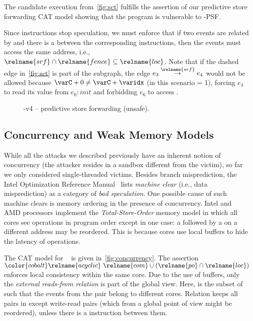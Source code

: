 \documentclass[conference]{IEEEtran}
\begin{document}
The candidate execution from~\autoref{fig:sct} fulfills the assertion of our predictive store forwarding CAT model showing that the program is vulnerable to \spectre-\textsc{PSF}.


Since \fence instructions stop speculation, we must enforce that if two events are related by  and there is a \fence between the corresponding instructions, then the events must access the same address, i.e., ${\relname{srf} \cap \relname{fence}} \subseteq {\relname{loc}}$.
Note that if the dashed  edge in~\autoref{fig:sct} is part of the subgraph, the edge $e_3 \stackrel{\relname{\scriptsize srf}}{\rightarrow} e_4$ would not be allowed because $\varC + 0 \not = \varC + \varidx$ (in this scenario \varidx = 1), forcing $e_4$ to read its value from $e_0: \mathit{init}$ and forbidding $e_6$ to access \secret.

\begin{figure}[t]
\centering
\scalebox{.8}{}
\caption{\spectre-v4 -- predictive store forwarding (unsafe).}
\label{fig:sct}
\end{figure}

\subsection{Concurrency and Weak Memory Models}
\label{sec:concurrency}

While all the attacks we described previously have an inherent notion of concurrency (the attacker resides in a sandbox different from the victim), so far we only considered single-threaded victims.
Besides branch misprediction, the Intel Optimization Reference Manual~\cite{intel-opt} lists \emph{machine clear} (i.e., data misprediction) as a category of \emph{bad speculation}.
One possible cause of such machine clears is memory ordering in the presence of concurrency.
Intel and AMD processors implement the \emph{Total-Store-Order} memory model in which all cores see operations in program order except in one case: a \store followed by a \load on a different address may be reordered. 
This is because cores use local buffers to hide the latency of \store operations.

The CAT model for \tso~\cite{SarkarSNORBMA09} is given in~\autoref{fig:concurrency}.
The assertion ${\color{cobalt}\relname{acyclic}}\,\,\relname{com}  \cup {(\relname{po} \cap \relname{loc})}$ enforces local consistency within the same core.
Due to the use of buffers, only the \emph{external reads-from relation} is part of the global view.
Here,  is the subset of  such that the events from the pair belong to different cores.
Relation  keeps all pairs in  except write-read pairs (which from a global point of view might be reordered), unless there is a \fence instruction between them.
\end{document}
